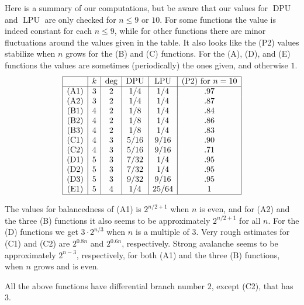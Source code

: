 \documentclass[11pt,english,a4paper]{amsart}
\theoremstyle{plain}
\theoremstyle{definition}
\theoremstyle{remark}
\begin{document}
	
	Here is a summary of our computations, but be aware that our values for $\operatorname{DPU}$ and $\operatorname{LPU}$ are only checked for $n\leq 9$ or $10$. For some functions the value is indeed constant for each $n\leq 9$, while for other functions there are minor fluctuations around the values given in the table. It also looks like the (P2) values stabilize when $n$ grows for the (B) and (C) functions. For the (A), (D), and (E) functions the values are sometimes (periodically) the ones given, and otherwise $1$. 
	\[
	\begin{array}{|c|c|c|c|c|c|} \hline
		& k & \deg & \operatorname{DPU} & \operatorname{LPU} & \text{(P2) for $n=10$} \\ \hline
		\text{(A1)} & 3 & 2 & 1/4 & 1/4 & .97 \\
		\text{(A2)} & 3 & 2 & 1/4 & 1/4 & .87 \\
		\text{(B1)} & 4 & 2 & 1/8 & 1/4 & .84 \\
		\text{(B2)} & 4 & 2 & 1/8 & 1/4 & .86 \\
		\text{(B3)} & 4 & 2 & 1/8 & 1/4 & .83 \\
		\text{(C1)} & 4 & 3 & 5/16 & 9/16 & .90 \\
		\text{(C2)} & 4 & 3 & 5/16 & 9/16 & .71 \\
		\text{(D1)} & 5 & 3 & 7/32 & 1/4 & .95 \\
		\text{(D2)} & 5 & 3 & 7/32 & 1/4 & .95 \\
		\text{(D3)} & 5 & 3 & 9/32 & 9/16 & .95 \\
		\text{(E1)} & 5 & 4 & 1/4 & 25/64 & 1 \\ \hline
	\end{array}
	\]

    The values for balancedness of (A1) is $2^{n/2+1}$ when $n$ is even, and for (A2) and the three (B) functions it also seems to be approximately $2^{n/2+1}$ for all $n$. For the (D) functions we get $3\cdot 2^{n/3}$ when $n$ is a multiple of $3$. Very rough estimates for (C1) and (C2) are $2^{0.8n}$ and $2^{0.6n}$, respectively. Strong avalanche seems to be approximately $2^{n-3}$, respectively, for both (A1) and the three (B) functions, when $n$ grows and is even.
    
    All the above functions have differential branch number $2$, except (C2), that has $3$.
		
\end{document}
